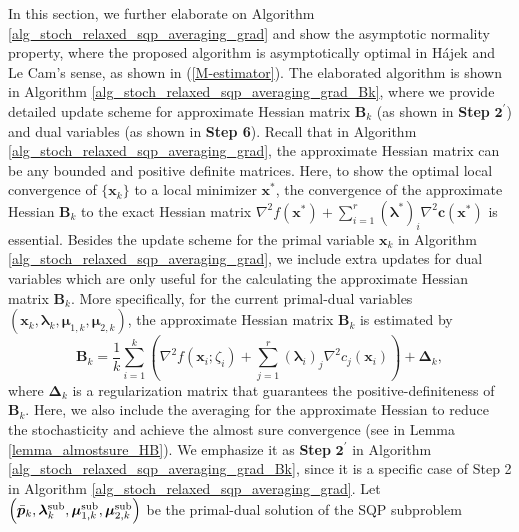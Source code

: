 \documentclass[aos]{imsart}
\numberwithin{equation}{section}
\theoremstyle{plain}
\newcommand{\michael}[1]{\textcolor{red}{Michael:\ #1}}
\newcommand{\yihang}[1]{\textcolor{blue}{Yihang:\ #1}}
\begin{document}
In this section, we further elaborate on Algorithm \ref{alg_stoch_relaxed_sqp_averaging_grad} and show the asymptotic normality property, where the proposed algorithm is asymptotically optimal in H\'ajek and Le Cam's sense, as shown in (\ref{M-estimator}). The elaborated algorithm is shown in Algorithm \ref{alg_stoch_relaxed_sqp_averaging_grad_Bk}, where we provide detailed update scheme for approximate Hessian matrix $\bm{B}_k$ (as shown in \textbf{Step} $\mathbf{2^{\prime}}$) and dual variables (as shown in \textbf{Step 6}).
Recall that in Algorithm \ref{alg_stoch_relaxed_sqp_averaging_grad}, the approximate Hessian matrix can be any bounded and positive definite matrices. Here, to show the optimal local convergence of $\{\bm{x}_k\}$ to a local minimizer $\bm{x}^{*}$, the convergence of the approximate Hessian $\bm{B}_k$ to the exact Hessian matrix $\nabla^2 f(\bm{x}^{*}) + \sum_{i=1}^{r} (\bm{\lambda}^{*})_{i} \nabla^2 \bm{c}(\bm{x}^{*})$ is essential. Besides the update scheme for the primal variable $\bm{x}_k$ in Algorithm \ref{alg_stoch_relaxed_sqp_averaging_grad}, we include extra updates for dual variables which are only useful for the calculating the approximate Hessian matrix $\bm{B}_k$. More specifically, for the current primal-dual variables $\left(\bm{x}_k, \bm{\lambda}_k, \bm{\mu}_{1,k}, \bm{\mu}_{2,k} \right)$, the approximate Hessian matrix $\bm{B}_k$ is estimated by 
\begin{equation*}
        \bm{B}_k = \frac{1}{k} \sum_{i=1}^{k} \left( \nabla^2 f(\bm{x}_i; \zeta_{i}) + \sum_{j=1}^{r} \left( \bm{\lambda}_{i}\right)_{j}\nabla^2 c_j(\bm{x}_{i})\right) + \bm{\Delta}_k,
\end{equation*}
 where $\bm{\Delta}_k$ is a regularization matrix that guarantees the positive-definiteness of $\bm{B}_k$. Here, we also include the averaging for the approximate Hessian to reduce the stochasticity and achieve the almost sure convergence (see in Lemma \ref{lemma_almostsure_HB}). 
We emphasize it as \textbf{Step} $\mathbf{2^{\prime}}$ in Algorithm \ref{alg_stoch_relaxed_sqp_averaging_grad_Bk}, since it is a specific case of Step 2 in Algorithm \ref{alg_stoch_relaxed_sqp_averaging_grad}. 
Let $\left(\Bar{\bm{p}}_k,  \bm{\lambda}_k^{\text{sub}}, \bm{\mu}_{1,k}^{\text{sub}}, \bm{\mu}_{2,k}^{\text{sub}} \right)$ be the primal-dual solution of the SQP subproblem 
\end{document}
